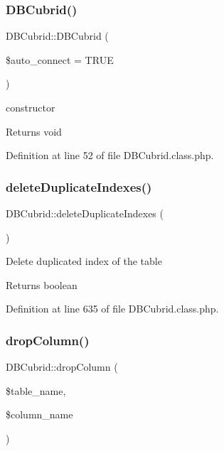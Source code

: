 \subsubsection{\texorpdfstring{D\+B\+Cubrid()}{DBCubrid()}}
{\footnotesize\ttfamily D\+B\+Cubrid\+::\+D\+B\+Cubrid (\begin{DoxyParamCaption}\item[{}]{\$auto\+\_\+connect = {\ttfamily TRUE} }\end{DoxyParamCaption})}

constructor \begin{DoxyReturn}{Returns}
void 
\end{DoxyReturn}


Definition at line 52 of file D\+B\+Cubrid.\+class.\+php.

\mbox{\label{classDBCubrid_a9035338394680f8400735de946506d85}} 
\subsubsection{\texorpdfstring{delete\+Duplicate\+Indexes()}{deleteDuplicateIndexes()}}
{\footnotesize\ttfamily D\+B\+Cubrid\+::delete\+Duplicate\+Indexes (\begin{DoxyParamCaption}{ }\end{DoxyParamCaption})}

Delete duplicated index of the table \begin{DoxyReturn}{Returns}
boolean 
\end{DoxyReturn}


Definition at line 635 of file D\+B\+Cubrid.\+class.\+php.

\mbox{\label{classDBCubrid_ad0b269d73617c6de8b3135ee36ae43d2}} 
\subsubsection{\texorpdfstring{drop\+Column()}{dropColumn()}}
{\footnotesize\ttfamily D\+B\+Cubrid\+::drop\+Column (\begin{DoxyParamCaption}\item[{}]{\$table\+\_\+name,  }\item[{}]{\$column\+\_\+name }\end{DoxyParamCaption})}

